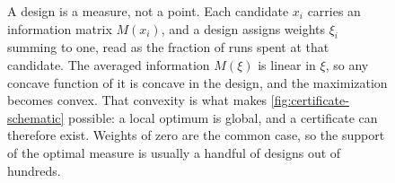 \documentclass[10pt]{article}
\begin{document}
\begin{figure}[t]
\centering
{}
\caption{A design is a measure, not a point. Each candidate $x_i$ carries an information
matrix $M(x_i)$, and a design assigns weights $\xi_i$ summing to one, read as the fraction of
runs spent at that candidate. The averaged information $M(\xi)$ is linear in $\xi$, so any
concave function of it is concave in the design, and the maximization becomes convex. That
convexity is what makes \cref{fig:certificate-schematic} possible: a local optimum is global,
and a certificate can therefore exist. Weights of zero are the common case, so the support of
the optimal measure is usually a handful of designs out of hundreds.}
\label{fig:measure}
\end{figure}
\end{document}
